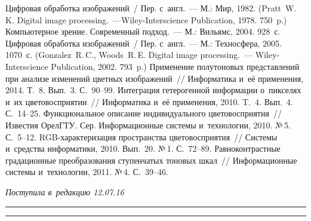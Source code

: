 \begin{multicols}{2}
{{\begin{thebibliography}{9}
 Цифровая обработка изображений~/ Пер. с~англ.~--- М.: Мир, 
1982. (Pratt~W.\,K. Digital image processing.~---Wiley-Interscience Publication, 
1978. 750~p.)
 Компьютерное зрение. Современный подход.~--- 
М.: Вильямс, 2004. 928~с. 
 Цифровая обработка изображений~/ Пер. с~англ.~--- 
М.: Техносфера, 2005. 1070~с. (Gonzalez~R.\,C.,  Woods~R.\,E. Digital image 
processing.~--- Wiley-Interscience Publication, 2002. 793~p.)
 Применение полутоновых представлений 
при анализе изменений цветных изоб\-ра\-же\-ний~// Информатика и~её 
применения, 2014. Т.~8. Вып.~3. С.~90--99.
 Интеграция гетерогенной информации 
о~пикселях и~их цветовосприятии~// Информатика и~её применения, 2010. 
T.~4. Вып.~4. С.~14--25.
 Функциональное описание 
индивидуального цветовосприятия~// Известия ОрелГТУ. Сер. 
Информационные системы и~технологии, 2010. №\,5. С.~5--12.
 RGB-ха\-рак\-те\-ри\-за\-ция пространства 
цветовосприятия~// Системы и~средства информатики, 2010. Вып.~20. №\,1. 
С.~72--89.
 Равноконтрастные градационные 
преобразования ступенчатых тоновых шкал~// Информационные системы 
и~технологии, 2011. №\,4. С.~39--46.
\end{thebibliography}

 }
 }

\end{multicols}

\vspace*{-6pt}

\hfill{\small\textit{Поступила в~редакцию 12.07.16}}

\vspace*{10pt}



\hrule

\vspace*{2pt}

\hrule




\def\tit{THE OPTION TO CREATE A~LOCAL COORDINATE SYSTEM 
FOR~SYNCHRONIZATION OF~SELECTED IMAGES}

